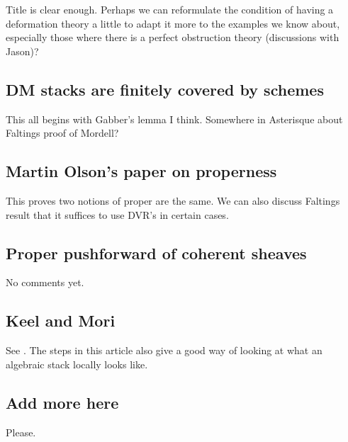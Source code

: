 \noindent
Title is clear enough. Perhaps we can reformulate the condition of having a
deformation theory a little to adapt it more to the examples we know about,
especially those where there is a perfect obstruction theory (discussions 
with Jason)?

\subsection{DM stacks are finitely covered by schemes}
\label{subsection-dm-finite-cover}

\noindent
This all begins with Gabber's lemma I think. Somewhere in Asterisque about
Faltings proof of Mordell?

\subsection{Martin Olson's paper on properness}
\label{subsection-proper-parametrization}

\noindent
This proves two notions of proper are the same. We can also discuss Faltings
result that it suffices to use DVR's in certain cases.

\subsection{Proper pushforward of coherent sheaves}
\label{subsection-proper-pushforward}

\noindent
No comments yet.

\subsection{Keel and Mori} 
\label{subsection-keel-mori}

\noindent
See \cite{K-M}. The steps in this article also give a good way of looking at
what an algebraic stack locally looks like.

\subsection{Add more here} 
\label{subsection-add-more}

\noindent
Please.









